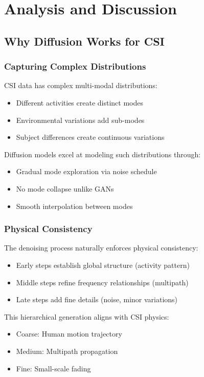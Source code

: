 \documentclass[journal]{IEEEtran}
\begin{document}
\section{Analysis and Discussion}

\subsection{Why Diffusion Works for CSI}

\subsubsection{Capturing Complex Distributions}
CSI data has complex multi-modal distributions:
\begin{itemize}
\item Different activities create distinct modes
\item Environmental variations add sub-modes
\item Subject differences create continuous variations
\end{itemize}

Diffusion models excel at modeling such distributions through:
\begin{itemize}
\item Gradual mode exploration via noise schedule
\item No mode collapse unlike GANs
\item Smooth interpolation between modes
\end{itemize}

\subsubsection{Physical Consistency}
The denoising process naturally enforces physical consistency:
\begin{itemize}
\item Early steps establish global structure (activity pattern)
\item Middle steps refine frequency relationships (multipath)
\item Late steps add fine details (noise, minor variations)
\end{itemize}

This hierarchical generation aligns with CSI physics:
\begin{itemize}
\item Coarse: Human motion trajectory
\item Medium: Multipath propagation
\item Fine: Small-scale fading
\end{itemize}
\end{document}
